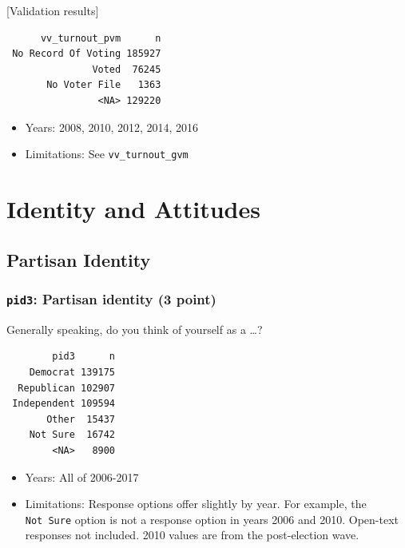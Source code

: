 \documentclass[10pt,article,oneside]{memoir}
\theoremstyle{definition}
\begin{document}
{[}Validation results{]}

\begin{verbatim}
      vv_turnout_pvm      n
 No Record Of Voting 185927
               Voted  76245
       No Voter File   1363
                <NA> 129220
\end{verbatim}

\begin{itemize}
\tightlist
\item
  Years: 2008, 2010, 2012, 2014, 2016
\item
  Limitations: See \texttt{vv\_turnout\_gvm}
\end{itemize}

\newpage

\hypertarget{identity-and-attitudes}{%
\section{Identity and Attitudes}\label{identity-and-attitudes}}

\hypertarget{partisan-identity}{%
\subsection{Partisan Identity}\label{partisan-identity}}

\hypertarget{pid3-partisan-identity-3-point}{%
\subsubsection{\texorpdfstring{\texttt{pid3}: Partisan identity (3
point)}{pid3: Partisan identity (3 point)}}\label{pid3-partisan-identity-3-point}}

Generally speaking, do you think of yourself as a \ldots{}?

\begin{verbatim}
        pid3      n
    Democrat 139175
  Republican 102907
 Independent 109594
       Other  15437
    Not Sure  16742
        <NA>   8900
\end{verbatim}

\begin{itemize}
\tightlist
\item
  Years: All of 2006-2017
\item
  Limitations: Response options offer slightly by year. For example, the
  \texttt{Not\ Sure} option is not a response option in years 2006 and
  2010. Open-text responses not included. 2010 values are from the
  post-election wave.
\end{itemize}
\end{document}
